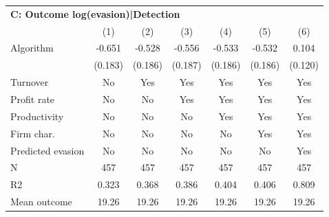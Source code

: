 \begin{tabular}{lcccccc}
\midrule \multicolumn{7}{l}{\textbf{C: Outcome log(evasion)|Detection}} \\ \multicolumn{1}{l}{} & (1) & (2) & (3) & (4) & (5) & (6) \\ \midrule
Algorithm   &      -0.651\sym{***}&      -0.528\sym{***}&      -0.556\sym{***}&      -0.533\sym{***}&      -0.532\sym{***}&       0.104         \\
            &     (0.183)         &     (0.186)         &     (0.187)         &     (0.186)         &     (0.186)         &     (0.120)         \\
\midrule
Turnover    &          No         &         Yes         &         Yes         &         Yes         &         Yes         &         Yes         \\
Profit rate &          No         &          No         &         Yes         &         Yes         &         Yes         &         Yes         \\
Productivity&          No         &          No         &          No         &         Yes         &         Yes         &         Yes         \\
Firm char.  &          No         &          No         &          No         &          No         &         Yes         &         Yes         \\
Predicted evasion&          No         &          No         &          No         &          No         &          No         &         Yes         \\
N           &         457         &         457         &         457         &         457         &         457         &         457         \\
R2          &       0.323         &       0.368         &       0.386         &       0.404         &       0.406         &       0.809         \\
Mean outcome&       19.26         &       19.26         &       19.26         &       19.26         &       19.26         &       19.26         \\
\bottomrule \end{tabular}
